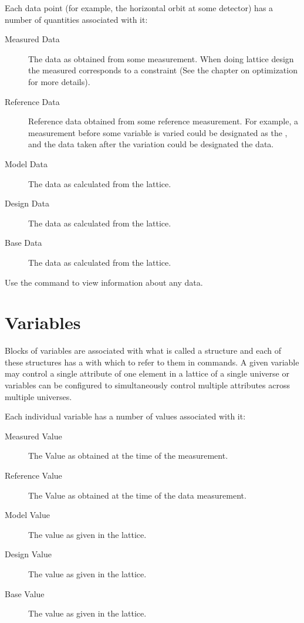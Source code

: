 Each data point (for example, the horizontal orbit at some
detector) has a number of quantities associated with it:
  \vspace*{-3ex}
  \begin{description}
  \item[Measured Data] \Newline 
The data as obtained from some measurement.
When doing lattice design the measured  corresponds to
a constraint (See the chapter on optimization for more details).
  \item[Reference Data] \Newline
Reference data obtained from some reference measurement. For example,
a measurement before some variable is varied could be designated as
the , and the data taken after the variation could be 
designated the  data.
  \item[Model Data] \Newline
The data as calculated from the  lattice.
  \item[Design Data] \Newline
The data as calculated from the  lattice.
  \item[Base Data] \Newline
The data as calculated from the  lattice.
  \end{description}

Use the  command to view information about any data.

\vfill
\break
\section{Variables}

Blocks of variables are associated with what is called a
 structure and each of these structures has a 
with which to refer to them in \tao commands. A given variable may
control a single attribute of one element in a  lattice
of a single universe or variables can be configured to simultaneously
control multiple attributes across multiple universes.

Each individual variable has a number of values associated with it:
  \vspace*{-3ex}
  \begin{description}
  \item[Measured Value] \Newline
The Value as obtained at the time of the  measurement.
  \item[Reference Value] \Newline
The Value as obtained at the time of the  data  measurement.
  \item[Model Value] \Newline
The value as given in the  lattice.
  \item[Design Value] \Newline
The value as given in the  lattice.
  \item[Base Value] \Newline
The value as given in the  lattice.
  \end{description}

